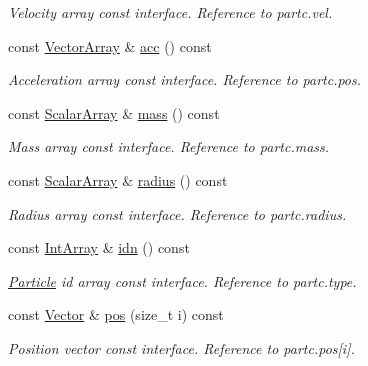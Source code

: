 \begin{DoxyCompactItemize}
\begin{DoxyCompactList}\small\item\em Velocity array const interface. Reference to partc.\+vel. \end{DoxyCompactList}\item 
const \mbox{\hyperlink{class_space_h_1_1_particle_system_acf48c66c8d42b85cd3a77911bb7da9ce}{Vector\+Array}} \& \mbox{\hyperlink{class_space_h_1_1_particle_system_a9c7f70968a15d3d02248b313b086b21d}{acc}} () const
\begin{DoxyCompactList}\small\item\em Acceleration array const interface. Reference to partc.\+pos. \end{DoxyCompactList}\item 
const \mbox{\hyperlink{class_space_h_1_1_particle_system_a7c621641dbb2bb4192af568758ed07bb}{Scalar\+Array}} \& \mbox{\hyperlink{class_space_h_1_1_particle_system_aa639ed5d2edbbfd49964d012e1971807}{mass}} () const
\begin{DoxyCompactList}\small\item\em Mass array const interface. Reference to partc.\+mass. \end{DoxyCompactList}\item 
const \mbox{\hyperlink{class_space_h_1_1_particle_system_a7c621641dbb2bb4192af568758ed07bb}{Scalar\+Array}} \& \mbox{\hyperlink{class_space_h_1_1_particle_system_a6a75cad68d5c752c05a4f898be6425b0}{radius}} () const
\begin{DoxyCompactList}\small\item\em Radius array const interface. Reference to partc.\+radius. \end{DoxyCompactList}\item 
const \mbox{\hyperlink{class_space_h_1_1_particle_system_a833833592d4c4750bbfa021610e94619}{Int\+Array}} \& \mbox{\hyperlink{class_space_h_1_1_particle_system_a2d5c1b26f3b8a85cd07deb3ade85180d}{idn}} () const
\begin{DoxyCompactList}\small\item\em \mbox{\hyperlink{struct_space_h_1_1_particle}{Particle}} id array const interface. Reference to partc.\+type. \end{DoxyCompactList}\item 
const \mbox{\hyperlink{class_space_h_1_1_particle_system_a7cb2705f7e4edf94131c31eda3edfded}{Vector}} \& \mbox{\hyperlink{class_space_h_1_1_particle_system_a779f51e7cf5ee524f02c09329496f6f0}{pos}} (size\+\_\+t i) const
\begin{DoxyCompactList}\small\item\em Position vector const interface. Reference to partc.\+pos\mbox{[}i\mbox{]}. \end{DoxyCompactList}\item 

\end{DoxyCompactItemize}

